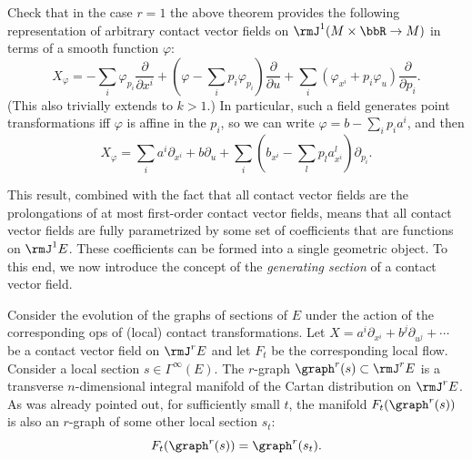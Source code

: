 \begin{xca}
    Check that in the case $r=1$ the above theorem provides the following representation of arbitrary contact vector fields on $\rmJ^1(M\times\bbR\to M)$ in terms of a smooth function $\varphi$:
    \[X_\varphi=-\sum_i \varphi_{p_i}\frac{\partial}{\partial x^i}+\left(\varphi-\sum_i p_i \varphi_{p_i}\right)\frac{\partial}{\partial u}+\sum_i \left(\varphi_{x^i}+p_i\varphi_u\right)\frac{\partial}{\partial p_i}.\label{eq Xf}\]
    (This also trivially extends to $k>1$.) In particular, such a field generates point transformations iff $\varphi$ is affine in the $p_i$, so we can write $\varphi=b-\sum_i p_ia^i$, and then 
    \[X_\varphi=\sum_i a^i\partial_{x^i}+b\partial_u+\sum_i\left(b_{x^i}-\sum_l p_l a^l_{x^i}\right)\partial_{p_i}.\]
\end{xca}

This result, combined with the fact that all contact vector fields are the prolongations of at most first-order contact vector fields, means that all contact vector fields are fully parametrized by some set of coefficients that are functions on $\rmJ^1E$. These coefficients can be formed into a single geometric object. To this end, we now introduce the concept of the \emph{generating section} of a contact vector field. 

Consider the evolution of the graphs of sections of $E$ under the action of the corresponding \gls{ops} of (local) contact transformations. Let $X=a^i\partial_{x^i}+b^j\partial_{u^j}+\cdots $ be a contact vector field on $\rmJ^r E$ and let $F_t$ be the corresponding local flow. Consider a local section $s\in\Gamma^\infty(E)$. The $r$-graph $\graph^r(s)\subset \rmJ^rE$ is a transverse $n$-dimensional integral manifold of the Cartan distribution on $\rmJ^rE$. As was already pointed out, for sufficiently small $t$, the manifold $F_t(\graph^r(s))$ is also an $r$-graph of some other local section $s_t$:
\[F_t(\graph^r(s))=\graph^r(s_t).\]


